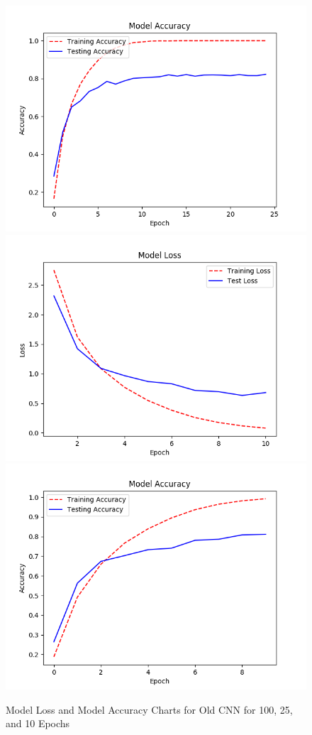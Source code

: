 \documentclass[11pt]{article}
\begin{document}
\begin{figure}[H]
\begin{center}
    \includegraphics[scale = 0.5]{images/OldModelAccuracy25Epochs.png}
    \includegraphics[scale=0.5]{images/OldModelLoss10Epochs.png}
    \includegraphics[scale = 0.5]{images/OldModelAccuracy10Epochs.png}
    \caption{Model Loss and Model Accuracy Charts for Old CNN for 100, 25, and 10 Epochs}
\end{center}
\end{figure}
\end{document}
